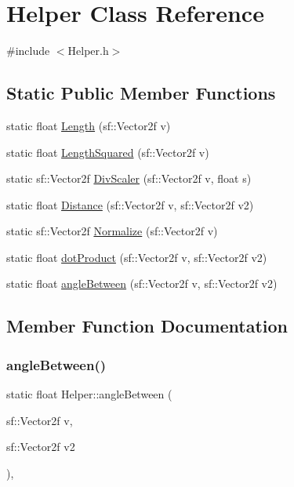 \hypertarget{class_helper}{}\section{Helper Class Reference}
\label{class_helper}


{\ttfamily \#include $<$Helper.\+h$>$}

\subsection*{Static Public Member Functions}
\begin{DoxyCompactItemize}
\item 
static float \hyperlink{class_helper_ad2b13a8d9fff4f913a57db9903df7709}{Length} (sf\+::\+Vector2f v)
\item 
static float \hyperlink{class_helper_ad6c52dd3a1875fbffc268196a6a6a887}{Length\+Squared} (sf\+::\+Vector2f v)
\item 
static sf\+::\+Vector2f \hyperlink{class_helper_a1a431211d082593425ccfafe077dd5bc}{Div\+Scaler} (sf\+::\+Vector2f v, float s)
\item 
static float \hyperlink{class_helper_aabf497b73c8aedbaf02b0f579ce73704}{Distance} (sf\+::\+Vector2f v, sf\+::\+Vector2f v2)
\item 
static sf\+::\+Vector2f \hyperlink{class_helper_a7565c8f3c91f44e139d7a4aaef6e0e34}{Normalize} (sf\+::\+Vector2f v)
\item 
static float \hyperlink{class_helper_a7a1497494599fe9b5bc68718c812d903}{dot\+Product} (sf\+::\+Vector2f v, sf\+::\+Vector2f v2)
\item 
static float \hyperlink{class_helper_a0a21ce7bbd26f902abbe5fe078b20044}{angle\+Between} (sf\+::\+Vector2f v, sf\+::\+Vector2f v2)
\end{DoxyCompactItemize}


\subsection{Member Function Documentation}
\mbox{\label{class_helper_a0a21ce7bbd26f902abbe5fe078b20044}} 
\subsubsection{\texorpdfstring{angle\+Between()}{angleBetween()}}
{\footnotesize\ttfamily static float Helper\+::angle\+Between (\begin{DoxyParamCaption}\item[{sf\+::\+Vector2f}]{v,  }\item[{sf\+::\+Vector2f}]{v2 }\end{DoxyParamCaption})\hspace{0.3cm}{\ttfamily [inline]}, {\ttfamily [static]}}


